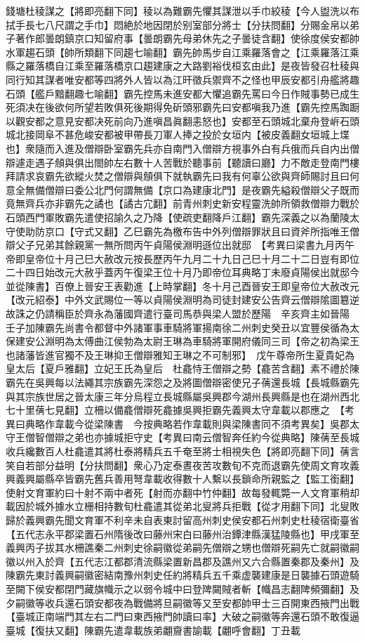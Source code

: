 錢塘杜稜謀之【將即亮翻下同】稜以為難霸先懼其謀泄以手巾絞稜【今人盥洗以布拭手長七八尺謂之手巾】悶絶於地因閉於别室部分將士【分扶問翻】分賜金帛以弟子著作郎曇朗鎮京口知留府事【曇朗霸先母弟休先之子曇徒含翻】使徐度侯安都帥水軍趨石頭【帥所類翻下同趨七喻翻】霸先帥馬步自江乘羅落會之【江乘羅落江乘縣之羅落橋自江乘至羅落橋京口趨建康之大路劉裕伐桓玄由此】是夜皆發召杜稜與同行知其謀者唯安都等四將外人皆以為江旰徵兵禦齊不之怪也甲辰安都引舟艦將趣石頭【艦戶黯翻趣七喻翻】霸先控馬未進安都大懼追霸先罵曰今日作賊事勢已成生死須决在後欲何所望若敗俱死後期得免斫頭邪霸先曰安都嗔我乃進【霸先控馬踟蹰以觀安都之意見安都决死前向乃進嗔昌眞翻恚怒也】安都至石頭城北棄舟登㟁石頭城北接岡阜不甚危峻安都被甲帶長刀軍人捧之投於女垣内【被皮義翻女垣城上堞也】衆隨而入進及僧辯卧室霸先兵亦自南門入僧辯方視事外白有兵俄而兵自内出僧辯遽走遇子頠與俱出閤帥左右數十人苦戰於聽事前【聽讀曰廳】力不敵走登南門樓拜請求哀霸先欲縱火焚之僧辯與頠俱下就執霸先曰我有何辜公欲與齊師賜討且曰何意全無備僧辯曰委公北門何謂無備【京口為建康北門】是夜霸先縊殺僧辯父子既而竟無齊兵亦非霸先之譎也【譎古宂翻】前青州刺史新安程靈洗帥所領救僧辯力戰於石頭西門軍敗霸先遣使招諭久之乃降【使疏吏翻降戶江翻】霸先深義之以為蘭陵太守使助防京口【守式又翻】乙巳霸先為檄布告中外列僧辯罪狀且曰資斧所指唯王僧辯父子兄弟其餘親黨一無所問丙午貞陽侯淵明遜位出就邸　【考異曰梁書九月丙午帝即皇帝位十月己巳大赦改元按長歷丙午九月二十九日己巳十月二十二日豈有即位二十四日始改元大赦乎蓋丙午復梁王位十月乃即帝位耳典略丁未廢貞陽侯出就邸今並從陳書】百僚上晉安王表勸進【上時掌翻】冬十月己酉晉安王即皇帝位大赦改元【改元紹泰】中外文武賜位一等以貞陽侯淵明為司徒封建安公告齊云僧辯隂圖簒逆故誅之仍請稱臣於齊永為藩國齊遣行臺司馬恭與梁人盟於歷陽　辛亥齊主如晉陽　壬子加陳霸先尚書令都督中外諸軍事車騎將軍揚南徐二州刺史癸丑以宜豐侯循為太保建安公淵明為太傅曲江侯勃為太尉王琳為車騎將軍開府儀同三司【帝之初為梁王也諸藩皆進官獨不及王琳抑王僧辯雅知王琳之不可制邪】　戊午尊帝所生夏貴妃為皇太后【夏戶雅翻】立妃王氏為皇后　杜龕恃王僧辯之勢【龕苦含翻】素不禮於陳霸先在吳興每以法繩其宗族霸先深怨之及將圖僧辯密使兄子蒨還長城【長城縣霸先與其宗族世居之晉太康三年分烏程立長城縣屬吳興郡今湖州長興縣是也在湖州西北七十里蒨七見翻】立柵以備龕僧辯死龕據吳興拒霸先義興太守韋載以郡應之　【考異曰典略作韋載今從梁陳書　今按典略若作韋載則與梁陳書同不須考異矣】吳郡太守王僧智僧辯之弟也亦據城拒守史【考異曰南云僧智奔任約今從典略】陳蒨至長城收兵纔數百人杜龕遣其將杜泰將精兵五千奄至將士相視失色【將即亮翻下同】蒨言笑自若部分益明【分扶問翻】衆心乃定泰晝夜苦攻數旬不克而退霸先使周文育攻義興義興屬縣卒皆霸先舊兵善用弩韋載收得數十人繫以長鎖命所親監之【監工銜翻】使射文育軍約曰十射不兩中者死【射而亦翻中竹仲翻】故每發輒斃一人文育軍稍却載因於城外據水立栅相持數旬杜龕遣其從弟北叟將兵拒戰【從才用翻下同】北叟敗歸於義興霸先聞文育軍不利辛未自表東討留高州刺史侯安都石州刺史杜稜宿衛臺省【五代志永平郡梁置石州隋後改曰藤州宋白曰藤州治鐔津縣漢猛陵縣也】甲戌軍至義興丙子拔其水柵譙秦二州刺史徐嗣徽從弟嗣先僧辯之甥也僧辯死嗣先亡就嗣徽嗣徽以州入於齊【五代志江都郡清流縣梁置新昌郡及譙州又六合縣置秦郡及秦州】及陳霸先東討義興嗣徽密結南豫州刺史任約將精兵五千乘虚襲建康是日襲據石頭遊騎至闕下侯安都閉門藏旗幟示之以弱令城中曰登陴闚賊者斬【幟昌志翻陴頻彌翻】及夕嗣徽等收兵還石頭安都夜為戰備將旦嗣徽等又至安都帥甲士三百開東西掖門出戰【臺城正南端門其左右二門曰東西掖門帥讀曰率】大破之嗣徽等奔還石頭不敢復逼臺城【復扶又翻】陳霸先遣韋載族弟翽齎書諭載【翽呼會翻】丁丑載